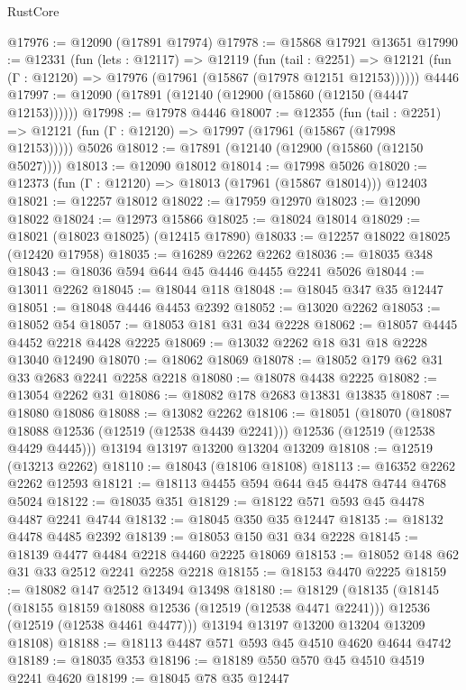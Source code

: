 \begin{lexlean}{RustCore}
\begin{coremodule}
@17976 := @12090 (@17891 @17974)
@17978 := @15868 @17921 @13651
@17990 := @12331
    (fun (lets : @12117) =>
    @12119
      (fun (tail : @2251) =>
      @12121 (fun (Γ : @12120) => @17976 (@17961 (@15867 (@17978 @12151 @12153))))))
    @4446
@17997 := @12090 (@17891 (@12140 (@12900 (@15860 (@12150 (@4447 @12153))))))
@17998 := @17978 @4446
@18007 := @12355
    (fun (tail : @2251) => @12121 (fun (Γ : @12120) => @17997 (@17961 (@15867 (@17998 @12153)))))
    @5026
@18012 := @17891 (@12140 (@12900 (@15860 (@12150 @5027))))
@18013 := @12090 @18012
@18014 := @17998 @5026
@18020 := @12373 (fun (Γ : @12120) => @18013 (@17961 (@15867 @18014))) @12403
@18021 := @12257 @18012
@18022 := @17959 @12970
@18023 := @12090 @18022
@18024 := @12973 @15866
@18025 := @18024 @18014
@18029 := @18021 (@18023 @18025) (@12415 @17890)
@18033 := @12257 @18022 @18025 (@12420 @17958)
@18035 := @16289 @2262 @2262
@18036 := @18035 @348
@18043 := @18036 @594 @644 @45 @4446 @4455 @2241 @5026
@18044 := @13011 @2262
@18045 := @18044 @118
@18048 := @18045 @347 @35 @12447
@18051 := @18048 @4446 @4453 @2392
@18052 := @13020 @2262
@18053 := @18052 @54
@18057 := @18053 @181 @31 @34 @2228
@18062 := @18057 @4445 @4452 @2218 @4428 @2225
@18069 := @13032 @2262 @18 @31 @18 @2228 @13040 @12490
@18070 := @18062 @18069
@18078 := @18052 @179 @62 @31 @33 @2683 @2241 @2258 @2218
@18080 := @18078 @4438 @2225
@18082 := @13054 @2262 @31
@18086 := @18082 @178 @2683 @13831 @13835
@18087 := @18080 @18086
@18088 := @13082 @2262
@18106 := @18051
    (@18070
      (@18087 @18088 @12536 (@12519 (@12538 @4439 @2241)))
      @12536
      (@12519 (@12538 @4429 @4445)))
    @13194
    @13197
    @13200
    @13204
    @13209
@18108 := @12519 (@13213 @2262)
@18110 := @18043 (@18106 @18108)
@18113 := @16352 @2262 @2262 @12593
@18121 := @18113 @4455 @594 @644 @45 @4478 @4744 @4768 @5024
@18122 := @18035 @351
@18129 := @18122 @571 @593 @45 @4478 @4487 @2241 @4744
@18132 := @18045 @350 @35 @12447
@18135 := @18132 @4478 @4485 @2392
@18139 := @18053 @150 @31 @34 @2228
@18145 := @18139 @4477 @4484 @2218 @4460 @2225 @18069
@18153 := @18052 @148 @62 @31 @33 @2512 @2241 @2258 @2218
@18155 := @18153 @4470 @2225
@18159 := @18082 @147 @2512 @13494 @13498
@18180 := @18129
    (@18135
      (@18145
        (@18155 @18159 @18088 @12536 (@12519 (@12538 @4471 @2241)))
        @12536
        (@12519 (@12538 @4461 @4477)))
      @13194
      @13197
      @13200
      @13204
      @13209
      @18108)
@18188 := @18113 @4487 @571 @593 @45 @4510 @4620 @4644 @4742
@18189 := @18035 @353
@18196 := @18189 @550 @570 @45 @4510 @4519 @2241 @4620
@18199 := @18045 @78 @35 @12447

\end{coremodule}
\end{lexlean}

